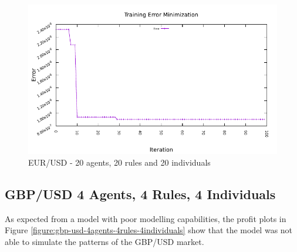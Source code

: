 \begin{figure}[htp]
  \medskip

  \includegraphics[width=.45\textwidth]{img/plots/eur_usd_h1-20agents-20rules-20ind-100gen_error_minimization.pdf}

  \caption{EUR/USD - 20 agents, 20 rules and 20 individuals}
  \label{figure:eur-usd-20agents-20rules-20individuals}
\end{figure}




\newpage

\subsection{GBP/USD 4 Agents, 4 Rules, 4 Individuals}
\label{results:forecast-gbp-usd-4agents-4rules-4individuals}

As expected from a model with poor modelling capabilities, the profit plots in Figure \ref{figure:gbp-usd-4agents-4rules-4individuals} show that the model was not able to simulate the patterns of the GBP/USD market.

